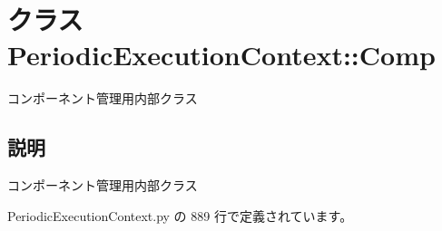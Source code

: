 \section{クラス PeriodicExecutionContext::Comp}
\label{classsource__py_1_1_periodic_execution_context_1_1_periodic_execution_context_1_1_comp}
コンポーネント管理用内部クラス  




\subsection{説明}
コンポーネント管理用内部クラス 

 PeriodicExecutionContext.py の 889 行で定義されています。